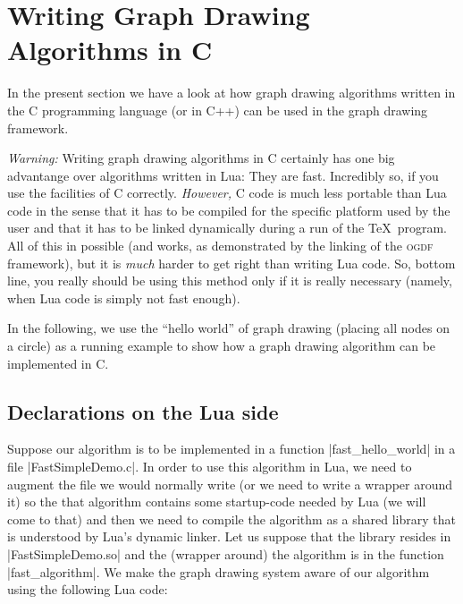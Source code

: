 %
%
%




\section{Writing Graph Drawing Algorithms in C}
\label{section-algorithms-in-c}


In the present section we have a look at how graph drawing
algorithms written in the C programming language (or in C++) can be
used in the graph drawing framework.

\emph{Warning:} Writing graph drawing algorithms in C certainly has
one big advantange over algorithms written in Lua: They are
fast. Incredibly so, if you use the facilities of C
correctly. \emph{However,} C code is much less portable than Lua
code in the sense that it has to be compiled for the specific
platform used by the user and that it has to be linked dynamically
during a run of the \TeX\ program. All of this in possible (and
works, as demonstrated by the linking of the \textsc{ogdf}
framework), but it is \emph{much} harder to get right than writing
Lua code. So, bottom line, you really should be using this method
only if it is really necessary (namely, when Lua code is simply not
fast enough).

In the following, we use the ``hello world'' of graph
drawing (placing all nodes on a circle) as a running example to show
how a graph drawing algorithm can be implemented in C.


\subsection{Declarations on the Lua side}

Suppose our algorithm is to be implemented in a function
|fast_hello_world| in a file |FastSimpleDemo.c|. In order to use this
algorithm in Lua, we need to augment the file we would normally write
(or we need to write a wrapper around it) so the that algorithm
contains some startup-code needed by Lua (we will come to that) and
then we need to compile the algorithm as a shared library that is
understood by Lua's dynamic linker. Let us suppose that the library resides in
|FastSimpleDemo.so| and the (wrapper around) the algorithm is in the
function |fast_algorithm|. We make the graph drawing system aware of
our algorithm using the following Lua code: 

